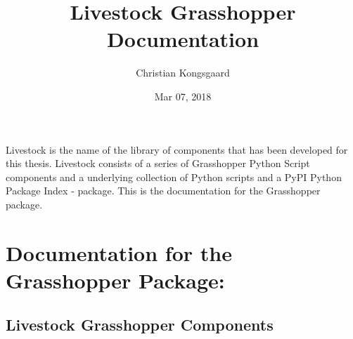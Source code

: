 \documentclass[letterpaper,10pt,english]{sphinxmanual}
\title{Livestock Grasshopper Documentation}
\date{Mar 07, 2018}
\author{Christian Kongsgaard}
\begin{document}
\maketitle
\sphinxtableofcontents
{}\label{\detokenize{index::doc}}


Livestock is the name of the library of components that has been developed for this thesis.
Livestock consists of a series of Grasshopper Python Script components and a underlying collection of Python scripts
and a PyPI \textendash{} Python Package Index - package. This is the documentation for the Grasshopper package.


\chapter{Documentation for the Grasshopper Package:}
\label{\detokenize{index:documentation-for-the-grasshopper-package}}\label{\detokenize{index:welcome-to-livestock-gh-s-documentation}}

\section{Livestock Grasshopper Components}
\label{\detokenize{components:components}}\label{\detokenize{components:livestock-grasshopper-components}}\label{\detokenize{components::doc}}
\end{document}
